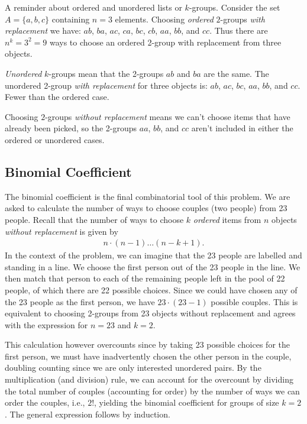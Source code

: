 A reminder about ordered and unordered lists or \(k\)-groups. 
Consider the set \(A = \{a,b,c\}\) containing \(n=3\) elements.
Choosing \emph{ordered} \(2\)-groups \emph{with replacement} we have: 
\(ab\), \(ba\), \(ac\), \(ca\), \(bc\), \(cb\), \(aa\), \(bb\), and \(cc\). 
Thus there are \(n^{k} = 3^2 = 9\) ways to choose an ordered 2-group 
with replacement from three objects.

\emph{Unordered} \(k\)-groups mean that the 2-groups \(ab\) and \(ba\) are the same. 
The unordered 2-group \emph{with replacement} for three objects is: 
\(ab\), \(ac\), \(bc\), \(aa\), \(bb\), and \(cc\).
Fewer than the ordered case.

Choosing \(2\)-groups \emph{without replacement} means we can't choose items
that have already been picked, 
so the 2-groups \(aa\), \(bb\), and \(cc\) aren't included in either the ordered or unordered cases.

\subsection{Binomial Coefficient}

The binomial coefficient is the final combinatorial tool of this problem. 
We are asked to calculate the number of ways to choose couples (two people) from 23 people. 
Recall that the number of ways to choose \(k\) \emph{ordered} items 
from \(n\) objects \emph{without replacement} is given by
\begin{align}
n\cdot(n - 1)\ldots(n - k + 1).
\end{align}
In the context of the problem, 
we can imagine that the 23 people are labelled and standing in a line. 
We choose the first person out of the 23 people in the line. 
We then match that person to each of the remaining people left in the pool of 22 people, 
of which there are 22 possible choices. 
Since we could have chosen any of the 23 people as the first person, 
we have \(23\cdot(23 - 1)\) possible couples. 
This is equivalent to choosing 2-groups from 23 objects without replacement and 
agrees with the expression for \(n=23\) and \(k=2\).

This calculation however overcounts since by taking 23 possible choices for the first person, 
we must have inadvertently chosen the other person in the couple,
doubling counting since we are only interested unordered pairs.
By the multiplication (and division) rule, 
we can account for the overcount by dividing the total number of couples (accounting for order) 
by the number of ways we can order the couples, i.e., \(2!\), 
yielding the binomial coefficient for groups of size \(k = 2\). 
The general expression follows by induction.



